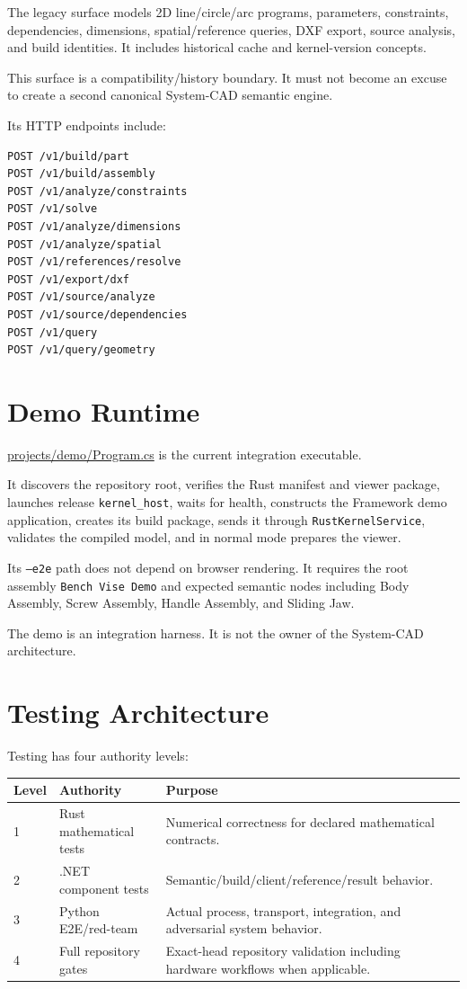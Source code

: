 \documentclass[11pt,a4paper]{report}
\newcommand{\pathref}[1]{\url{#1}}
\begin{document}
The legacy surface models 2D line/circle/arc programs, parameters, constraints, dependencies, dimensions, spatial/reference queries, DXF export, source analysis, and build identities. It includes historical cache and kernel-version concepts.

This surface is a compatibility/history boundary. It must not become an excuse to create a second canonical System-CAD semantic engine.

Its HTTP endpoints include:

\begin{lstlisting}
POST /v1/build/part
POST /v1/build/assembly
POST /v1/analyze/constraints
POST /v1/solve
POST /v1/analyze/dimensions
POST /v1/analyze/spatial
POST /v1/references/resolve
POST /v1/export/dxf
POST /v1/source/analyze
POST /v1/source/dependencies
POST /v1/query
POST /v1/query/geometry
\end{lstlisting}

\chapter{Demo Runtime}

\pathref{projects/demo/Program.cs} is the current integration executable.

It discovers the repository root, verifies the Rust manifest and viewer package, launches release \texttt{kernel\_host}, waits for health, constructs the Framework demo application, creates its build package, sends it through \texttt{RustKernelService}, validates the compiled model, and in normal mode prepares the viewer.

Its \texttt{--e2e} path does not depend on browser rendering. It requires the root assembly \texttt{Bench Vise Demo} and expected semantic nodes including Body Assembly, Screw Assembly, Handle Assembly, and Sliding Jaw.

The demo is an integration harness. It is not the owner of the System-CAD architecture.

\chapter{Testing Architecture}

Testing has four authority levels:

\begin{tabularx}{\textwidth}{@{}p{}p{}X@{}}
\toprule
Level & Authority & Purpose \\
\midrule
1 & Rust mathematical tests & Numerical correctness for declared mathematical contracts. \\
2 & .NET component tests & Semantic/build/client/reference/result behavior. \\
3 & Python E2E/red-team & Actual process, transport, integration, and adversarial system behavior. \\
4 & Full repository gates & Exact-head repository validation including hardware workflows when applicable. \\
\bottomrule
\end{tabularx}
\end{document}
